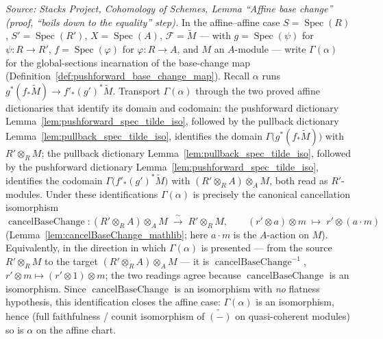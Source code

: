 \begin{lemma}
  \textit{Source: Stacks Project, Cohomology of Schemes, Lemma ``Affine base
  change'' (proof, ``boils down to the equality'' step).}
  In the affine--affine case \(S = \operatorname{Spec}(R)\),
  \(S' = \operatorname{Spec}(R')\), \(X = \operatorname{Spec}(A)\),
  \(\mathcal{F} = \widetilde{M}\) — with \(g = \operatorname{Spec}(\psi)\) for
  \(\psi : R \to R'\), \(f = \operatorname{Spec}(\varphi)\) for \(\varphi : R \to A\),
  and \(M\) an \(A\)-module — write \(\Gamma(\alpha)\) for the global-sections
  incarnation of the base-change map (Definition~\ref{def:pushforward_base_change_map}).
  Recall \(\alpha\) runs
  \(g^*(f_*\widetilde{M}) \to f'_*(g')^*\widetilde{M}\). Transport \(\Gamma(\alpha)\)
  through the two proved affine dictionaries that identify its domain and codomain: the
  pushforward dictionary Lemma~\ref{lem:pushforward_spec_tilde_iso}, followed by the
  pullback dictionary Lemma~\ref{lem:pullback_spec_tilde_iso}, identifies the domain
  \(\Gamma\bigl(g^*(f_*\widetilde{M})\bigr)\) with \(R' \otimes_R M\); the pullback
  dictionary Lemma~\ref{lem:pullback_spec_tilde_iso}, followed by the pushforward
  dictionary Lemma~\ref{lem:pushforward_spec_tilde_iso}, identifies the codomain
  \(\Gamma\bigl(f'_*(g')^*\widetilde{M}\bigr)\) with \((R' \otimes_R A) \otimes_A M\),
  both read as \(R'\)-modules. Under these identifications \(\Gamma(\alpha)\) is
  precisely the canonical cancellation isomorphism
  \[
    \operatorname{cancelBaseChange} :
    (R' \otimes_R A) \otimes_A M \;\xrightarrow{\ \sim\ }\; R' \otimes_R M,
    \qquad (r' \otimes a) \otimes m \;\mapsto\; r' \otimes (a \cdot m)
  \]
  (Lemma~\ref{lem:cancelBaseChange_mathlib}; here \(a \cdot m\) is the \(A\)-action on \(M\)). Equivalently, in the direction in which
  \(\Gamma(\alpha)\) is presented — from the source \(R' \otimes_R M\) to the target
  \((R' \otimes_R A) \otimes_A M\) — it is \(\operatorname{cancelBaseChange}^{-1}\),
  \(r' \otimes m \mapsto (r' \otimes 1) \otimes m\); the two readings agree because
  \(\operatorname{cancelBaseChange}\) is an isomorphism. Since
  \(\operatorname{cancelBaseChange}\) is an isomorphism with \emph{no} flatness
  hypothesis, this identification closes the affine case: \(\Gamma(\alpha)\) is an
  isomorphism, hence (full faithfulness / counit isomorphism of \(\widetilde{(-)}\) on
  quasi-coherent modules) so is \(\alpha\) on the affine chart.

\end{lemma}

